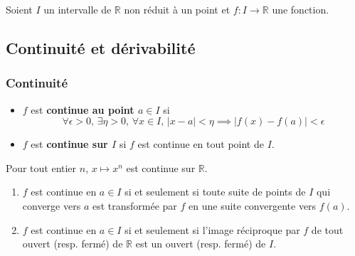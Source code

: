 




  Soient $I$ un intervalle de $\mathbb{R}$ non réduit à un point et $f : I \rightarrow \mathbb{R}$ une fonction.

  \subsection{Continuité et dérivabilité}

  \subsubsection{Continuité}


  \begin{definition}
    \begin{itemize}
      \item $f$ est \textbf{continue au point $a \in I$} si
      \[ \forall \epsilon > 0, \, \exists \eta > 0, \, \forall x \in I, \, \vert x - a \vert < \eta \implies \vert f(x) - f(a) \vert < \epsilon \]
      \item $f$ est \textbf{continue sur $I$} si $f$ est continue en tout point de $I$.
    \end{itemize}
  \end{definition}

  \begin{example}
    Pour tout entier $n$, $x \mapsto x^n$ est continue sur $\mathbb{R}$.
  \end{example}

  \begin{theorem}
    \begin{enumerate}[label=(\roman*)]
      \item $f$ est continue en $a \in I$ si et seulement si toute suite de points de $I$ qui converge vers $a$ est transformée par $f$ en une suite convergente vers $f(a)$.
      \item $f$ est continue en $a \in I$ si et seulement si l'image réciproque par $f$ de tout ouvert (resp. fermé) de $\mathbb{R}$ est un ouvert (resp. fermé) de $I$.
    \end{enumerate}
  \end{theorem}

